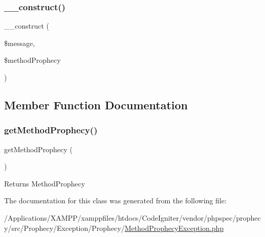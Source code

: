 \subsubsection{\texorpdfstring{\+\_\+\+\_\+construct()}{\_\_construct()}}
{\footnotesize\ttfamily \+\_\+\+\_\+construct (\begin{DoxyParamCaption}\item[{}]{\$message,  }\item[{\mbox{\hyperlink{class_prophecy_1_1_prophecy_1_1_method_prophecy}{Method\+Prophecy}}}]{\$method\+Prophecy }\end{DoxyParamCaption})}



\subsection{Member Function Documentation}
\mbox{\label{class_prophecy_1_1_exception_1_1_prophecy_1_1_method_prophecy_exception_a9a864b8cd714331bdf5a91c471d30b05}} 
\subsubsection{\texorpdfstring{get\+Method\+Prophecy()}{getMethodProphecy()}}
{\footnotesize\ttfamily get\+Method\+Prophecy (\begin{DoxyParamCaption}{ }\end{DoxyParamCaption})}

\begin{DoxyReturn}{Returns}
Method\+Prophecy 
\end{DoxyReturn}


The documentation for this class was generated from the following file\+:\begin{DoxyCompactItemize}
\item 
/\+Applications/\+X\+A\+M\+P\+P/xamppfiles/htdocs/\+Code\+Igniter/vendor/phpspec/prophecy/src/\+Prophecy/\+Exception/\+Prophecy/\mbox{\hyperlink{_method_prophecy_exception_8php}{Method\+Prophecy\+Exception.\+php}}\end{DoxyCompactItemize}
